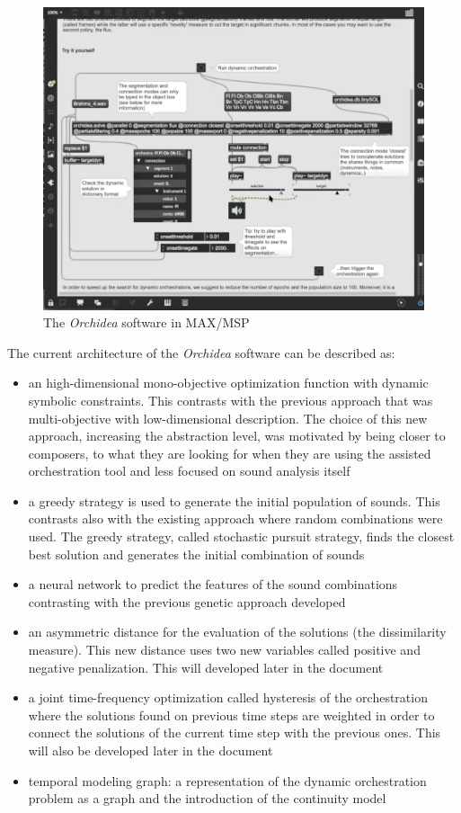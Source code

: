 \documentclass[a4paper]{book}
\begin{document}
\begin{figure}[!ht]
    \centering
    \includegraphics[scale=0.4]{maxsol.png}
    \caption{The \textit{Orchidea} software in MAX/MSP}
    \label{fig:max}
\end{figure}

The current architecture of the \textit{Orchidea} software can be described as:
\begin{itemize}
    \item an high-dimensional mono-objective optimization function with dynamic symbolic constraints. This contrasts with the previous approach that was multi-objective with  low-dimensional description. The choice of this new approach, increasing the abstraction level, was motivated by being closer to composers, to what they are looking for when they are using the assisted orchestration tool and less focused on sound analysis itself
    \item a greedy strategy is used to generate the initial population of sounds. This contrasts also with the existing approach where random combinations were used. The greedy strategy, called stochastic pursuit strategy, finds the closest best solution and generates the initial combination of sounds 
    \item a neural network to predict the features of the sound combinations contrasting with the previous genetic approach developed
    \item an asymmetric distance for the evaluation of the solutions (the dissimilarity measure). This new distance uses two new variables called positive and negative penalization. This will developed later in the document 
    \item a joint time-frequency optimization called hysteresis of the orchestration where the solutions found on previous time steps are weighted in order to connect the solutions of the current time step with the previous ones. This will also be developed later in the document
    \item temporal modeling graph: a representation of the dynamic orchestration problem as a graph and the introduction of the continuity model
\end{itemize}
\end{document}
